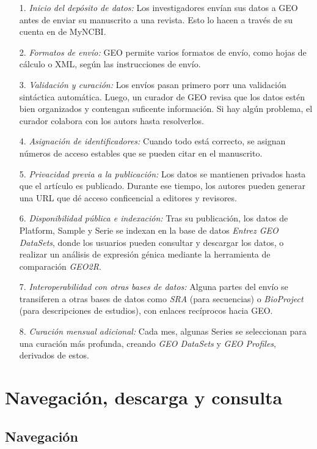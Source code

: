 \begin{itemize}
    \item[1.] \textit{Inicio del depósito de datos:} Los investigadores envían sus datos a GEO antes de enviar su manuscrito a una revista. Esto lo hacen a través de su cuenta en 
    de MyNCBI.
    \item[2.] \textit{Formatos de envío:} GEO permite varios formatos de envío, como hojas de cálculo o XML, según las instrucciones de envío.
    \item[3.] \textit{Validación y curación:} Los envíos pasan primero porr una validación sintáctica automática. Luego, un curador de GEO revisa que los datos estén bien organizados
    y contengan suficente información. Si hay algún problema, el curador colabora con los autors hasta resolverlos.
    \item[4.] \textit{Asignación de identificadores:} Cuando todo está correcto, se asignan números de acceso estables que se pueden citar en el manuscrito.
    \item[5.] \textit{Privacidad previa a la publicación:} Los datos se mantienen privados hasta que el artículo es publicado. Durante ese tiempo, los autores pueden generar una URL
    que dé acceso conficencial a editores y revisores.
    \item[6.] \textit{Disponibilidad pública e indexación:} Tras su publicación, los datos de Platform, Sample y Serie se indexan en la base de datos \textit{Entrez GEO DataSets}, donde
    los usuarios pueden consultar y descargar los datos, o realizar un análisis de expresión génica mediante la herramienta de comparación \textit{GEO2R}.
    \item[7.] \textit{Interoperabilidad con otras bases de datos:} Alguna partes del envío se transiferen a otras bases de datos como \textit{SRA} (para secuencias) o \textit{BioProject}
    (para descripciones de estudios), con enlaces recíprocos hacia GEO.
    \item[8.] \textit{Curación mensual adicional:} Cada mes, algunas Series se seleccionan para una curación más profunda, creando \textit{GEO DataSets} y \textit{GEO Profiles}, derivados 
    de estos.
    
\end{itemize}

\section{Navegación, descarga y consulta}


\subsection{Navegación}

